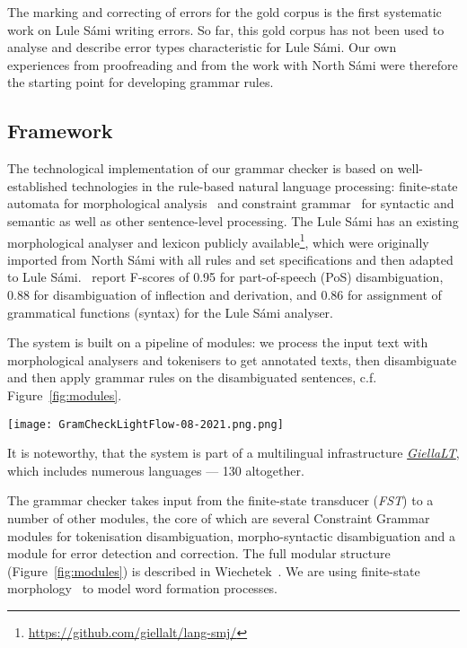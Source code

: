 \documentclass[free]{flammie}
\begin{document}
The marking and correcting of errors for the gold corpus is the first systematic
work on Lule Sámi writing errors. So far, this gold corpus has not been used to
analyse and describe error types characteristic for Lule Sámi. Our own
experiences from proofreading and from the work with North Sámi were therefore
the starting point for developing grammar rules.




\subsection{Framework}

The technological implementation of our grammar checker is based on
well-established technologies in the rule-based natural language processing:
finite-state automata for morphological
analysis~\cite{beesley2003finite,linden2013hFST} and constraint
grammar~\cite{karlsson1990constraint,bick2015cg} for syntactic and semantic as
well as other sentence-level processing.  The Lule Sámi has an existing
morphological analyser and lexicon publicly
available\footnote{\url{https://github.com/giellalt/lang-smj/}}, which were
originally imported from North Sámi with all rules and set specifications and
then adapted to Lule Sámi. \cite{Antonsen2010reusing}~report F-scores of 0.95
for part-of-speech (PoS) disambiguation, 0.88 for disambiguation of inflection
and derivation, and 0.86 for assignment of grammatical functions (syntax) for
the Lule Sámi analyser.

The system is built on a pipeline of modules: we process the input text with
morphological analysers and tokenisers to get annotated texts, then disambiguate
and then apply grammar rules on the disambiguated sentences, c.f.
Figure~\ref{fig:modules}.

\begin{figure*}
    \centering
    \texttt{[image: GramCheckLightFlow-08-2021.png.png]}
    \caption{Structure of a grammar checker\label{fig:modules}}
\end{figure*}

It is noteworthy, that the system is part of a multilingual infrastructure
\textit{\href{https://github.com/giellalt}{GiellaLT}}, which includes numerous
languages --- 130 altogether.

The grammar checker takes input from the finite-state transducer (\textit{FST})
to a number of other modules, the core of which are several Constraint Grammar
modules for tokenisation disambiguation, morpho-syntactic disambiguation and a
module for error detection and correction. The full modular structure
(Figure~\ref{fig:modules}) is described in Wiechetek~\cite{Wiechetek2019many}.
We are using finite-state morphology~\cite{beesley2003finite} to model word
formation processes.
\end{document}
